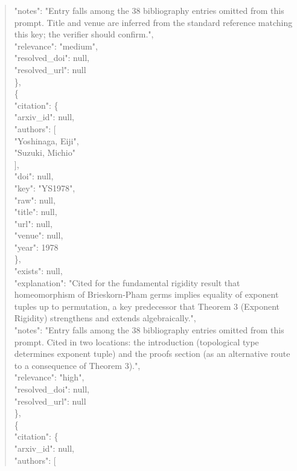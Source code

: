 \documentclass[11pt]{article}
\begin{document}
\begin{quote}
      "notes": "Entry falls among the 38 bibliography entries omitted from this prompt. Title and venue are inferred from the standard reference matching this key; the verifier should confirm.",\\
      "relevance": "medium",\\
      "resolved\_doi": null,\\
      "resolved\_url": null\\
    \},\\
    \{\\
      "citation": \{\\
        "arxiv\_id": null,\\
        "authors": [\\
          "Yoshinaga, Eiji",\\
          "Suzuki, Michio"\\
        ],\\
        "doi": null,\\
        "key": "YS1978",\\
        "raw": null,\\
        "title": null,\\
        "url": null,\\
        "venue": null,\\
        "year": 1978\\
      \},\\
      "exists": null,\\
      "explanation": "Cited for the fundamental rigidity result that homeomorphism of Brieskorn-Pham germs implies equality of exponent tuples up to permutation, a key predecessor that Theorem 3 (Exponent Rigidity) strengthens and extends algebraically.",\\
      "notes": "Entry falls among the 38 bibliography entries omitted from this prompt. Cited in two locations: the introduction (topological type determines exponent tuple) and the proofs section (as an alternative route to a consequence of Theorem 3).",\\
      "relevance": "high",\\
      "resolved\_doi": null,\\
      "resolved\_url": null\\
    \},\\
    \{\\
      "citation": \{\\
        "arxiv\_id": null,\\
        "authors": [\\

\end{quote}
\end{document}
